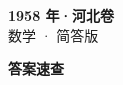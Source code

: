 \documentclass[zihao=-4, a4paper]{ctexart}
\begin{document}
\begin{center}
  {\Large\bfseries 1958 年·河北卷}\\[4pt]
  {\large 数学 · 简答版}
\end{center}
\medskip
{}

\clearpage
{}
\begin{center}{\Large\bfseries 答案速查}\end{center}
\medskip

\end{document}
